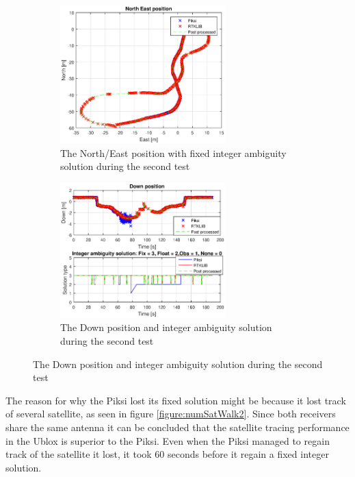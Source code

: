 \begin{figure}[H]
\begin{subfigure}[H]{1\textwidth}
	\centering
		\includegraphics[width=0.7\textwidth]{figs/plots/xywalk2.eps}
		\caption{The North/East position with fixed integer ambiguity solution during the second test}
		\label{figure:xyWalk2}
\end{subfigure}
\begin{subfigure}[H]{1\textwidth}
	\centering
		\includegraphics[width=0.7\textwidth]{figs/plots/downWalk2.eps}
		\caption{The Down position and integer ambiguity solution during the second test}
		\label{figure:downWalk2}
\end{subfigure}

\end{figure}
The reason for why the Piksi lost its fixed solution might be because it lost track of several satellite, as seen in figure \ref{figure:numSatWalk2}. Since both receivers share the same antenna it can be concluded that the satellite tracing performance in the Ublox is superior to the Piksi.  Even when the Piksi managed to regain track of the satellite it lost, it took 60 seconds before it regain a fixed integer solution. 
